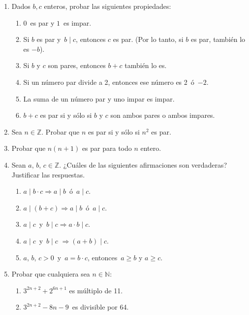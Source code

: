 \documentclass[a4paper,12pt,twoside,spanish,reqno]{amsbook}
\numberwithin{equation}{section}
\begin{document}
\begin{enumerate}
\item Dados $b,c$ enteros, probar las siguientes propiedades:
  \begin{enumerate}
  \item  $0$\, es par y $1$\, es impar.
  \item  Si $b$ es par y \,$b \mid c$, entonces $c$ es par.  (Por lo tanto, si $b$ es par, también lo es $-b$).
  \item  Si $b$ y $c$ son pares, entonces $b+c$ también lo es. %
  \item  Si un número par divide a 2, entonces ese número es 2\, ó \,$-2$.
  \item  La suma de un número par y uno impar es impar.
  \item $b + c$ es par si y  sólo si $b$ y $c$ son ambos pares o ambos impares.
\end{enumerate}


\item Sea $n\in \mathbb Z$. Probar que $n$ es par si y sólo si $n^2$ es par.


\item Probar que $n(n+1)$ es par para todo $n$ entero.


\item Sean $a$, $b$, $c \in {\mathbb Z}$. ¿Cuáles de las siguientes afirmaciones son verdaderas? Justificar las respuestas.
  \begin{enumerate}
  \item $a \mid b\cdot c \Rightarrow a \mid b$\, ó \,$a \mid c$.
  \item $a \mid (b+c) \Rightarrow a\mid b$\, ó \,$a \mid c$.
  \item $a \mid c$\, y \,$b \mid c \Rightarrow a\cdot b \mid c$.
  \item $a \mid c$\, y \,$b \mid c$ $\Rightarrow (a +b) \mid c$.
  \item $a$, $b$, $c>0$\, y \,$a=b\cdot c$, entonces\, $a \ge b$ y $a \ge c$.
  \end{enumerate}



\item Probar que cualquiera sea $n \in {\mathbb N}$:
  \begin{enumerate}
  \item $3^{2n+2}+ 2^{6n+1}$ es múltiplo de 11.
  \item $3^{2n+2} - 8n - 9$\, es divisible por 64.
  \end{enumerate}



\end{enumerate}
\end{document}
